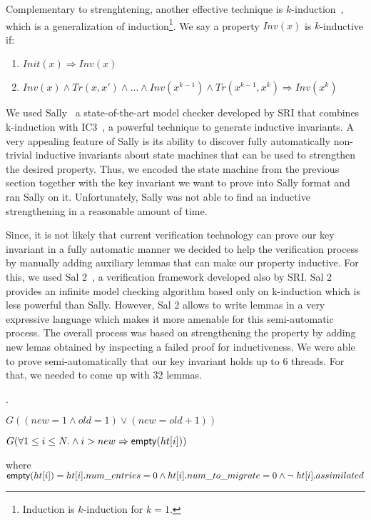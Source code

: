 Complementary to strenghtening, another effective technique is
$k$-induction~\cite{MouraRS03}, which is a generalization of
induction\footnote{Induction is $k$-induction for $k=1$.}. We say a
property $Inv(x)$ is $k$-inductive if:

\begin{enumerate}
\item $Init(x) \Rightarrow Inv(x)$
\item $Inv(x) \wedge Tr(x,x') \wedge \ldots \wedge Inv(x^{k-1}) \wedge Tr(x^{k-1},x^{k}) \Rightarrow Inv(x^{k})$
\end{enumerate}


We used Sally~\cite{sally} a state-of-the-art model checker developed
by SRI that combines k-induction with IC3~\cite{Bradley11}, a powerful
technique to generate inductive invariants. A very appealing feature
of Sally is its ability to discover fully automatically non-trivial
inductive invariants about state machines that can be used to
strengthen the desired property.
%
Thus, we encoded the state machine from the previous section together
with the key invariant we want to prove into Sally format and ran
Sally on it. Unfortunately, Sally was not able to find an inductive
strengthening in a reasonable amount of time.

Since, it is not likely that current verification technology can prove
our key invariant in a fully automatic manner we decided to help the
verification process by manually adding auxiliary lemmas that can make
our property inductive.
%
For this, we used Sal 2~\cite{sal2}, a verification framework
developed also by SRI. Sal 2 provides an infinite model checking
algorithm based only on k-induction which is less powerful than
Sally. However, Sal 2 allows to write lemmas in a very expressive
language which makes it more amenable for this semi-automatic
process. The overall process was based on strengthening the property
by adding new lemas obtained by inspecting a failed proof for
inductiveness. We were able to prove semi-automatically that our key
invariant holds up to 6 threads. For that, we needed to come up with
32 lemmas.

.

\begin{lemma} %
  $G((new = 1 \wedge old = 1) \vee (new = old+1))$
    \label{lemma1}
\end{lemma}

\begin{lemma} %
  $G(\forall 1 \leq i \leq N.  \wedge i > new \Rightarrow \mathsf{empty}(\mbox{$ht[i]$}))$

  \noindent where $\mathsf{empty}(\mbox{$ht[i]$})= \mbox{$ht[i]$}.num\_entries = 0 \wedge
  \mbox{$ht[i]$}.num\_to\_migrate = 0 \wedge \mbox{$\neg\ \mbox{$ht[i]$}.assimilated$}$
  \label{lemma2}  
\end{lemma}  

